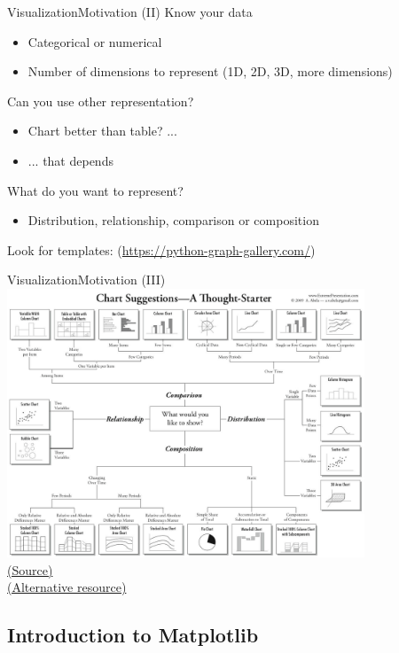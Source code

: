 \documentclass[10pt,compress]{beamer} %
\begin{document}
\begin{frame}{Visualization}{Motivation (II)}
	Know your data
	\begin{itemize}
		\item Categorical or numerical
		\item Number of dimensions to represent (1D, 2D, 3D, more dimensions)
	\end{itemize}
	Can you use other representation?
	\begin{itemize}
		\item Chart better than table? ...
		\item ... that depends
	\end{itemize}
	What do you want to represent?
	\begin{itemize}
		\item Distribution, relationship, comparison or composition
	\end{itemize}
	Look for templates: (\url{https://python-graph-gallery.com/})
\end{frame}

\begin{frame}[plain]{Visualization}{Motivation (III)}
	\centering \includegraphics[width=0.8\textwidth]{figs/chart-selection-diagram.png}\\
	\centering \tiny \href{https://flex.bi/create-beautiful-dashboard-works/}{(Source)}\\
	\href{http://experception.net/Franconeri_ExperCeptionDotNet_ChartChooser.pdf}{(Alternative resource)}
\end{frame}

\subsection{Introduction to Matplotlib}
\end{document}
